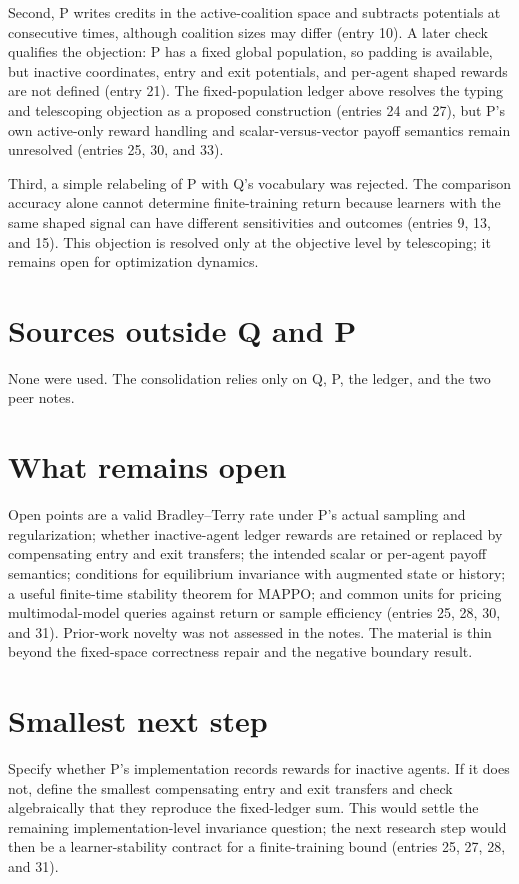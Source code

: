 \documentclass{article}
\begin{document}
Second, P writes credits in the active-coalition space and subtracts potentials at consecutive times, although coalition sizes may differ (entry 10).  A later check qualifies the objection: P has a fixed global population, so padding is available, but inactive coordinates, entry and exit potentials, and per-agent shaped rewards are not defined (entry 21).  The fixed-population ledger above resolves the typing and telescoping objection as a proposed construction (entries 24 and 27), but P's own active-only reward handling and scalar-versus-vector payoff semantics remain unresolved (entries 25, 30, and 33).

Third, a simple relabeling of P with Q's vocabulary was rejected.  The comparison accuracy alone cannot determine finite-training return because learners with the same shaped signal can have different sensitivities and outcomes (entries 9, 13, and 15).  This objection is resolved only at the objective level by telescoping; it remains open for optimization dynamics.

\section*{Sources outside Q and P}
None were used.  The consolidation relies only on Q, P, the ledger, and the two peer notes.

\section*{What remains open}
Open points are a valid Bradley--Terry rate under P's actual sampling and regularization; whether inactive-agent ledger rewards are retained or replaced by compensating entry and exit transfers; the intended scalar or per-agent payoff semantics; conditions for equilibrium invariance with augmented state or history; a useful finite-time stability theorem for MAPPO; and common units for pricing multimodal-model queries against return or sample efficiency (entries 25, 28, 30, and 31).  Prior-work novelty was not assessed in the notes.  The material is thin beyond the fixed-space correctness repair and the negative boundary result.

\section*{Smallest next step}
Specify whether P's implementation records rewards for inactive agents.  If it does not, define the smallest compensating entry and exit transfers and check algebraically that they reproduce the fixed-ledger sum.  This would settle the remaining implementation-level invariance question; the next research step would then be a learner-stability contract for a finite-training bound (entries 25, 27, 28, and 31).
\end{document}
